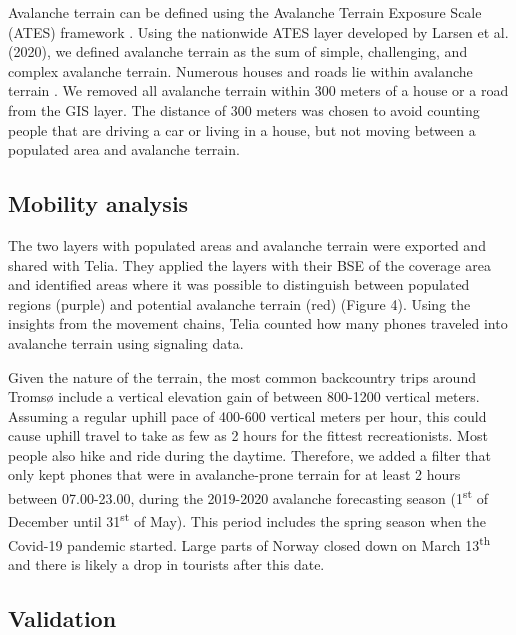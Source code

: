 \documentclass[authordate,empirical]{jote-new-article}
\begin{document}
Avalanche terrain can be defined using the Avalanche Terrain Exposure Scale (ATES) framework \parencites{Statham2006}. Using the nationwide ATES layer developed by Larsen et al.(2020), we defined avalanche terrain as the sum of simple, challenging, and complex avalanche terrain. Numerous houses and roads lie within avalanche terrain \parencites{Kalsnes2021}. We removed all avalanche terrain within 300 meters of a house or a road from the GIS layer. The distance of 300 meters was chosen to avoid counting people that are driving a car or living in a house, but not moving between a populated area and avalanche terrain.







\subsection{Mobility analysis}



The two layers with populated areas and avalanche terrain were exported and shared with Telia. They applied the layers with their BSE of the coverage area and identified areas where it was possible to distinguish between populated regions (purple) and potential avalanche terrain (red) (Figure 4). Using the insights from the movement chains, Telia counted how many phones traveled into avalanche terrain using signaling data.







Given the nature of the terrain, the most common backcountry trips around Tromsø include a vertical elevation gain of between 800-1200 vertical meters. Assuming a regular uphill pace of 400-600 vertical meters per hour, this could cause uphill travel to take as few as 2 hours for the fittest recreationists. Most people also hike and ride during the daytime. Therefore, we added a filter that only kept phones that were in avalanche-prone terrain for at least 2 hours between 07.00-23.00, during the 2019-2020 avalanche forecasting season (1\textsuperscript{st} of December until 31\textsuperscript{st} of May). This period includes the spring season when the Covid-19 pandemic started. Large parts of Norway closed down on March 13\textsuperscript{th} and there is likely a drop in tourists after this date.






\subsection{Validation}
\end{document}
